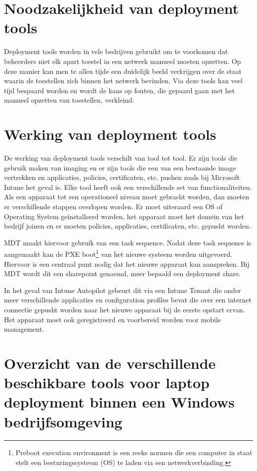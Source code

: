 \section{Noodzakelijkheid van deployment tools}

Deployment tools worden in vele bedrijven gebruikt om te voorkomen dat beheerders niet elk apart toestel in een netwerk manueel moeten opzetten. Op deze manier kan men te allen tijde een duidelijk beeld verkrijgen over de staat waarin de toestellen zich binnen het netwerk bevinden. Via deze tools kan veel tijd bespaard worden en wordt de kans op fouten, die gepaard gaan met het manueel opzetten van toestellen, verkleind. \autocite{Goessens2020}


\section{Werking van deployment tools}

De werking van deployment tools verschilt van tool tot tool. Er zijn tools die gebruik maken van imaging en er zijn tools die een van een bestaande image vertrekken en applicaties, policies, certificaten, etc. pushen zoals bij Microsoft Intune het geval is. Elke tool heeft ook een verschillende set van functionaliteiten. Als een apparaat tot een operationeel niveau moet gebracht worden, dan moeten er verschillende stappen overlopen worden. Er moet uiteraard een OS of Operating System geïnstalleerd worden, het apparaat moet het domein van het bedrijf joinen en er moeten policies, applicaties, certificaten, etc. gepusht worden. \autocite{Goessens2020}

MDT maakt hiervoor gebruik van een task sequence. Nadat deze task sequence is aangemaakt kan de PXE boot\footnote{Preboot execution environment is een reeks normen die een computer in staat stelt een besturingssysteem (OS) te laden via een netwerkverbinding.} van het nieuwe systeem worden uitgevoerd. Hiervoor is een centraal punt nodig dat het nieuwe apparaat kan aanspreken. Bij MDT wordt dit een sharepoint genoemd, meer bepaald een deployment share. \autocite{Goessens2020}

In het geval van Intune Autopilot gebeurt dit via een Intune Tenant die onder meer verschillende applicaties en configuration profiles bevat die over een internet connectie gepusht worden naar het nieuwe apparaat bij de eerste opstart ervan. Het apparaat moet ook geregistreerd en voorbereid worden voor mobile management.

\section{Overzicht van de verschillende beschikbare tools voor laptop deployment binnen een Windows bedrijfsomgeving}

